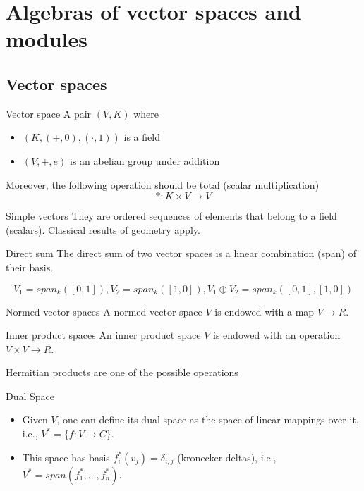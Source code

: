 \documentclass[presentation]{beamer}
\begin{document}
\section{Algebras of vector spaces and modules}
\label{sec:orga19d0bc}
\subsection{Vector spaces}
\label{sec:orgb9bb799}

\begin{frame}[label={sec:org86dc961}]{Vector space}
A pair \((V,K)\) where

\begin{itemize}
\item \((K,(+,0),(\cdot,1))\) is a field
\item \((V,+,e)\) is an abelian group under addition
\end{itemize}

Moreover, the following operation should be total (scalar multiplication)
\[
    *: K \times V \rightarrow V
    \]
\end{frame}

\begin{frame}[label={sec:orge557e44}]{Simple vectors}
They are ordered sequences of elements that belong to a field (\href{https://en.wikipedia.org/wiki/Scalar\_(mathematics)}{scalars)}.
Classical results of geometry apply.
\end{frame}

\begin{frame}[label={sec:orgdd11a05}]{Direct sum}
The direct sum of two vector spaces is a linear combination (span) of their basis.

$$V_1=span_k([0,1]), V_2=span_k([1,0]), V_1 \oplus V_2 = span_k([0,1],[1,0])$$
\end{frame}

\begin{frame}[label={sec:orge50fa71}]{Normed vector spaces}
A \alert{normed} vector space \(V\) is endowed with a map \(V \rightarrow R\).
\end{frame}

\begin{frame}[label={sec:org166a617}]{Inner product spaces}
An \alert{inner product} space \(V\) is endowed with an operation \(V \times V \rightarrow R\).

Hermitian products are one of the possible operations
\end{frame}

\begin{frame}[label={sec:org6caaff0}]{Dual Space}
\begin{itemize}
\item Given \(V\), one can define its dual space as the space of linear mappings
over it, i.e., \(V^* = \{f: V \rightarrow C \}\).

\item This space has basis \(f_i^*(v_j)=\delta_{i,j}\) (kronecker deltas), i.e.,
\(V^*=span(f_1^*, \ldots, f_n^*)\).
\end{itemize}
\end{frame}
\end{document}
